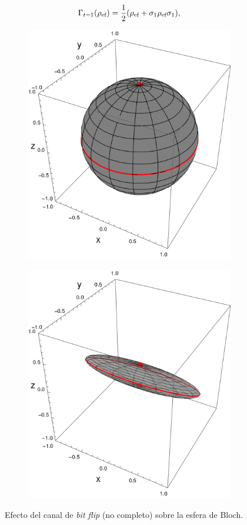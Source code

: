 \begin{equation}
  \Gamma_{t=1}(\rho_{\text{ef}})=\frac{1}{2}\qty(\rho_{\text{ef}}+\sigma_{1}\rho_{\text{ef}}\sigma_{1}),\nonumber
\end{equation}
\begin{figure}[ht!]
  \centering
  \begin{subfigure}{0.5\textwidth}
    \centering
    \includegraphics[width=0.6\linewidth]{chapter3/figures_toy/sphere_swapcontraction_t=0.0_z=0.9_p=0.9.png}
  \end{subfigure}%
  \begin{subfigure}{0.5\textwidth}
    \centering
    \includegraphics[width=0.6\linewidth]{chapter3/figures_toy/sphere_BitF_t=1.0_z=0.8_p=0.6.png}
  \end{subfigure}
  \caption{Efecto del canal de \textit{bit flip} (no completo) sobre la esfera de Bloch.}\label{fig:BitFlip}
\end{figure}
